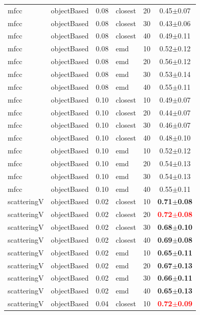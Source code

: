 \documentclass[12pt,a4paper,fleqn]{tufte-handout}
\begin{document}
\begin{table}
\begin{center}
\begin{tabular}{lllllc}
mfcc & objectBased & 0.08 & closest & 20 & 0.45$\pm$0.07 \\   
mfcc & objectBased & 0.08 & closest & 30 & 0.43$\pm$0.06 \\   
mfcc & objectBased & 0.08 & closest & 40 & 0.49$\pm$0.11 \\   
mfcc & objectBased & 0.08 & emd & 10 & 0.52$\pm$0.12 \\   
mfcc & objectBased & 0.08 & emd & 20 & 0.56$\pm$0.12 \\   
mfcc & objectBased & 0.08 & emd & 30 & 0.53$\pm$0.14 \\   
mfcc & objectBased & 0.08 & emd & 40 & 0.55$\pm$0.11 \\   
mfcc & objectBased & 0.10 & closest & 10 & 0.49$\pm$0.07 \\   
mfcc & objectBased & 0.10 & closest & 20 & 0.44$\pm$0.07 \\   
mfcc & objectBased & 0.10 & closest & 30 & 0.46$\pm$0.07 \\   
mfcc & objectBased & 0.10 & closest & 40 & 0.48$\pm$0.10 \\   
mfcc & objectBased & 0.10 & emd & 10 & 0.52$\pm$0.12 \\   
mfcc & objectBased & 0.10 & emd & 20 & 0.54$\pm$0.13 \\   
mfcc & objectBased & 0.10 & emd & 30 & 0.54$\pm$0.13 \\   
mfcc & objectBased & 0.10 & emd & 40 & 0.55$\pm$0.11 \\   
scatteringV & objectBased & 0.02 & closest & 10 & \textbf{0.71$\pm$0.08} \\   
scatteringV & objectBased & 0.02 & closest & 20 & \textbf{\textcolor{red}{0.72$\pm$0.08}} \\   
scatteringV & objectBased & 0.02 & closest & 30 & \textbf{0.68$\pm$0.10} \\   
scatteringV & objectBased & 0.02 & closest & 40 & \textbf{0.69$\pm$0.08} \\   
scatteringV & objectBased & 0.02 & emd & 10 & \textbf{0.65$\pm$0.11} \\   
scatteringV & objectBased & 0.02 & emd & 20 & \textbf{0.67$\pm$0.13} \\   
scatteringV & objectBased & 0.02 & emd & 30 & \textbf{0.66$\pm$0.11} \\   
scatteringV & objectBased & 0.02 & emd & 40 & \textbf{0.65$\pm$0.13} \\   
scatteringV & objectBased & 0.04 & closest & 10 & \textbf{\textcolor{red}{0.72$\pm$0.09}} \\   

\end{tabular}
\end{center}
\end{table}
\end{document}
